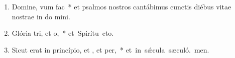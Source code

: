\begin{flushleft}
\begin{enumerate}[leftmargin=*]
\item Domine, vum  fac~* et psalmos nostros cantábimus cunctis diébus vitae nostrae in do mini.
\item Glória tri, et o,~* \mbox{et Spirítu cto.}
\item Sicut erat in princípio, et , et per,~* \mbox{et in s\'{\ae}cula sæculó. men.}

\end{enumerate}
\end{flushleft}


